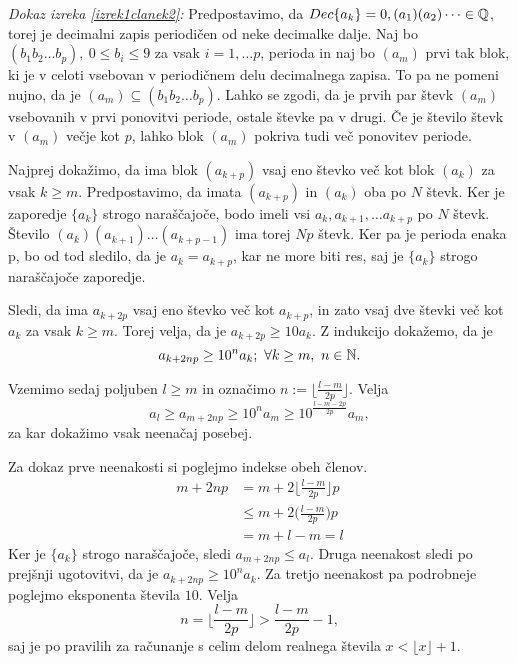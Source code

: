\documentclass[twoside,11pt]{article}
\begin{document}
\QED

\noindent
{\em Dokaz izreka \ref{izrek1clanek2}:\/} Predpostavimo, da $Dec\{a_k\} = 0,(a_1)(a_2)\dots \in \mathbb{Q}$,
 torej je decimalni zapis periodičen od neke decimalke dalje. Naj bo
$(b_1b_2 \dots b_p), \ 0 \leq b_i \leq 9$ za vsak $i = 1, \dots p$, perioda in naj bo
$(a_m)$ prvi tak blok, ki je v celoti vsebovan v periodičnem delu decimalnega zapisa.
To pa ne pomeni nujno, da je $(a_m) \subseteq (b_1b_2 \dots b_p)$. Lahko se zgodi, da je prvih par števk
$(a_m)$ vsebovanih v prvi ponovitvi periode, ostale števke pa v drugi. Če je število števk v $(a_m)$ večje kot $p$,
lahko blok $(a_m)$ pokriva tudi več ponovitev periode.

Najprej dokažimo, da ima blok $(a_{k+p})$ vsaj eno števko več kot blok $(a_k)$ za vsak $k \geq m$.
Predpostavimo, da imata $(a_{k+p})$ in $(a_k)$ oba po $N$ števk. 
Ker je zaporedje $\{a_k\}$ strogo naraščajoče, bodo imeli vsi $a_k, a_{k+1}, \dots a_{k+p}$ po $N$ števk.
Število $(a_k)(a_{k+1})\dots (a_{k+p-1})$ ima torej $Np$ števk. Ker pa je perioda enaka p,
bo od tod sledilo, da je $a_k = a_{k+p}$, kar ne more biti res, saj je $\{a_k\}$ strogo naraščajoče zaporedje.

Sledi, da ima $a_{k+ 2p}$ vsaj eno števko več kot $a_{k+p}$, in zato vsaj dve števki več kot $a_k$
za vsak $k \geq m$.
Torej velja, da je $a_{k+2p} \geq 10 a_k$. Z indukcijo dokažemo, da je 
\[ a_{k+2np} \geq 10^n a_k; \ \forall k \geq m, \ n \in \mathbb{N}.\]

Vzemimo sedaj poljuben $l \geq m$ in označimo $n := \lfloor \frac{l-m}{2p} \rfloor$.
Velja 
\begin{equation}\label{enacba1}
    a_l \geq a_{m+2np} \geq 10^n a_m \geq 10 ^{\frac{l-m-2p}{2p}}a_m,
\end{equation}
za kar dokažimo vsak neenačaj posebej.

Za dokaz prve neenakosti si poglejmo indekse obeh členov. 
\[
    \begin{split}
    m + 2np &= m + 2 \bigg\lfloor \frac{l-m}{2p}\bigg\rfloor p \\
    &\leq m + 2\bigg(\frac{l-m}{2p}\bigg)p \\
    &= m + l - m = l
    \end{split}
    \] 
Ker je $\{a_k\}$ strogo naraščajoče, sledi $a_{m+2np} \leq a_l$.
Druga neenakost sledi po prejšnji ugotovitvi, da je $a_{k+2np} \geq 10^n a_k$.
Za tretjo neenakost pa podrobneje poglejmo eksponenta števila $10$. Velja
\[
    n = \bigg\lfloor \frac{l-m}{2p}\bigg\rfloor > \frac{l-m}{2p} - 1,
     \]
saj je po pravilih za računanje s celim delom realnega števila $x < \lfloor x\rfloor + 1$.
\end{document}
